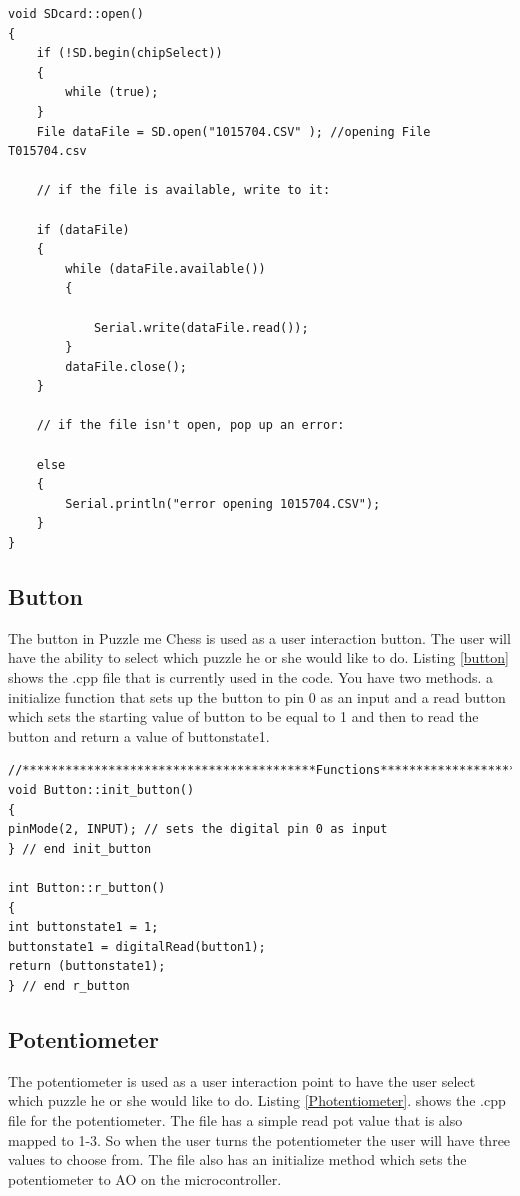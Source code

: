 \documentclass[11pt]{article}
\begin{document}
\newpage

\begin{lstlisting}[caption={Puzzle me Chess - SDcard.cpp file},label={sdcard1}]
void SDcard::open()
{
    if (!SD.begin(chipSelect))
    {
        while (true);
    }
    File dataFile = SD.open("1015704.CSV" ); //opening File T015704.csv

    // if the file is available, write to it:

    if (dataFile)
    {
        while (dataFile.available())
        {

            Serial.write(dataFile.read());
        }
        dataFile.close();
    }

    // if the file isn't open, pop up an error:

    else
    {
        Serial.println("error opening 1015704.CSV");
    }
}
\end{lstlisting}

\subsection{Button}
The button in Puzzle me Chess is used as a user interaction button. The user will have the ability to select which puzzle he or she would like to do. Listing \ref{button} shows the .cpp file that is currently used in the code. You have two methods. a initialize function that sets up the button to pin 0 as an input and a read button which sets the starting value of button to be equal to 1 and then to read the button and return a value of buttonstate1. 

\begin{lstlisting}[caption={Puzzle me Chess - button.cpp file},label={button}]
//*****************************************Functions********************//
void Button::init_button()
{
pinMode(2, INPUT); // sets the digital pin 0 as input
} // end init_button

int Button::r_button()
{
int buttonstate1 = 1; 
buttonstate1 = digitalRead(button1);
return (buttonstate1);
} // end r_button
\end{lstlisting}

\subsection{Potentiometer}
The potentiometer is used as a user interaction point to have the user select which puzzle he or she would like to do. Listing \ref{Photentiometer}. shows the .cpp file for the potentiometer. The file has a simple read pot value that is also mapped to 1-3. So when the user turns the potentiometer the user will have three values to choose from. The file also has an initialize method which sets the potentiometer to AO on the microcontroller. 
\end{document}
